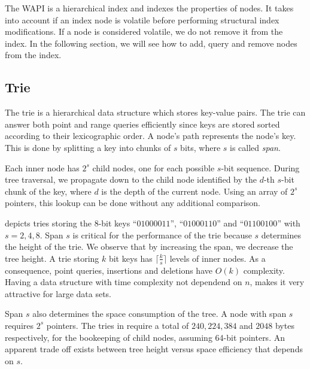 \documentclass[abstracton,12pt]{scrartcl}
\theoremstyle{definition}
\begin{document}
The WAPI is a hierarchical index and indexes the properties of nodes.
It takes into account if an index node is volatile before performing structural index modifications.
If a node is considered volatile, we do not remove it from the index.
In the following section, we will see how to add, query and remove nodes from the index.

\subsection{Trie}

The trie \cite{fredkin1960trie} is a hierarchical data structure which
stores key-value pairs. The trie can answer both point and range queries 
efficiently since keys are stored sorted according to their lexicographic order.
A node's path represents the node's key. This is done by splitting a key into
chunks of $s$ bits, where $s$ is called \textit{span}. 

Each inner node has 
$2^s$ child nodes, one for each possible $s$-bit sequence. During tree
traversal, we propagate down to the child node identified by the $d$-th
$s$-bit chunk of the key, where $d$ is the depth of the current node. 
Using an array of $2^s$  pointers, this lookup can be done without any 
additional comparison. 

 depicts tries storing the 
8-bit keys ``$01000011$'', ``$01000110$'' and ``$01100100$'' with 
$s=2, 4, 8$. Span $s$ is critical for the performance of the trie because $s$ 
determines the height of the trie. We observe that by increasing the span, 
we decrease the tree height. A trie
storing $k$ bit keys has $\lceil \frac{k}{s} \rceil$ levels of inner nodes.
As a consequence, point queries, insertions and deletions have 
$O(k)$ complexity. Having a data structure with
time complexity not dependend on $n$, makes it very attractive for large
data sets.

Span $s$ also determines the space consumption of the tree.
A node with span $s$ requires $2^s$ pointers. The tries in 
 require a total of $240, 224, 384$ and $2048$ bytes 
respectively, for the bookeeping of child nodes, assuming 64-bit pointers.
An apparent trade off exists between tree height versus space efficiency that
depends on $s$.
\end{document}
